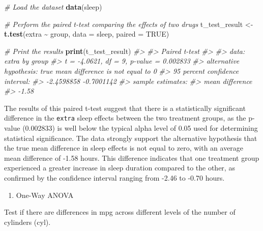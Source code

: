 \documentclass[
]{book}
\newenvironment{Shaded}{\begin{snugshade}}{\end{snugshade}}
\newcommand{\AttributeTok}[1]{\textcolor[rgb]{0.13,0.29,0.53}{#1}}
\newcommand{\CommentTok}[1]{\textcolor[rgb]{0.56,0.35,0.01}{\textit{#1}}}
\newcommand{\ConstantTok}[1]{\textcolor[rgb]{0.56,0.35,0.01}{#1}}
\newcommand{\FunctionTok}[1]{\textcolor[rgb]{0.13,0.29,0.53}{\textbf{#1}}}
\newcommand{\NormalTok}[1]{#1}
\newcommand{\OtherTok}[1]{\textcolor[rgb]{0.56,0.35,0.01}{#1}}
\newcommand{\SpecialCharTok}[1]{\textcolor[rgb]{0.81,0.36,0.00}{\textbf{#1}}}
\providecommand{\tightlist}{%
  \setlength{\itemsep}{0pt}\setlength{\parskip}{0pt}}
\begin{document}
\begin{Shaded}
\begin{Highlighting}[]
\CommentTok{\# Load the dataset}
\FunctionTok{data}\NormalTok{(sleep)}

\CommentTok{\# Perform the paired t{-}test comparing the effects of two drugs}
\NormalTok{t\_test\_result }\OtherTok{\textless{}{-}} \FunctionTok{t.test}\NormalTok{(extra }\SpecialCharTok{\textasciitilde{}}\NormalTok{ group, }\AttributeTok{data =}\NormalTok{ sleep, }\AttributeTok{paired =} \ConstantTok{TRUE}\NormalTok{)}

\CommentTok{\# Print the results}
\FunctionTok{print}\NormalTok{(t\_test\_result)}
\CommentTok{\#\textgreater{} }
\CommentTok{\#\textgreater{}  Paired t{-}test}
\CommentTok{\#\textgreater{} }
\CommentTok{\#\textgreater{} data:  extra by group}
\CommentTok{\#\textgreater{} t = {-}4.0621, df = 9, p{-}value = 0.002833}
\CommentTok{\#\textgreater{} alternative hypothesis: true mean difference is not equal to 0}
\CommentTok{\#\textgreater{} 95 percent confidence interval:}
\CommentTok{\#\textgreater{}  {-}2.4598858 {-}0.7001142}
\CommentTok{\#\textgreater{} sample estimates:}
\CommentTok{\#\textgreater{} mean difference }
\CommentTok{\#\textgreater{}           {-}1.58}
\end{Highlighting}
\end{Shaded}

The results of this paired t-test suggest that there is a statistically significant difference in the \texttt{extra} sleep effects between the two treatment groups, as the p-value (0.002833) is well below the typical alpha level of 0.05 used for determining statistical significance. The data strongly support the alternative hypothesis that the true mean difference in sleep effects is not equal to zero, with an average mean difference of -1.58 hours. This difference indicates that one treatment group experienced a greater increase in sleep duration compared to the other, as confirmed by the confidence interval ranging from -2.46 to -0.70 hours.

\begin{enumerate}
\def\labelenumi{\alph{enumi}.}
\setcounter{enumi}{3}
\tightlist
\item
  One-Way ANOVA
\end{enumerate}

Test if there are differences in mpg across different levels of the number of cylinders (cyl).
\end{document}
